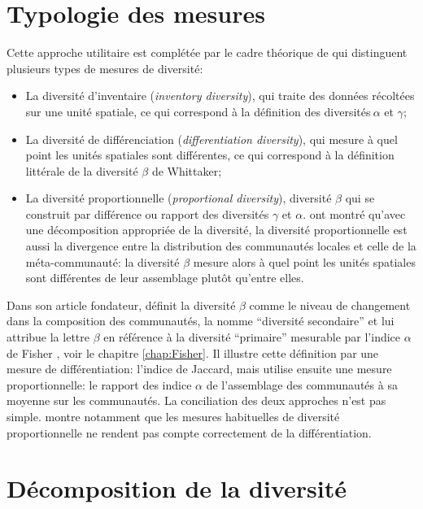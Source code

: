 \documentclass[
  11pt,
  french,
  a4paper,
  extrafontsizes,onecolumn,openright
  ]{memoir}
\providecommand{\tightlist}{%
  \setlength{\itemsep}{0pt}\setlength{\parskip}{0pt}}
\begin{document}
\hypertarget{sec:betaTypo}{%
\section{Typologie des mesures}\label{sec:betaTypo}}

Cette approche utilitaire est complétée par le cadre théorique de \textcite{Jurasinski2009} qui distinguent plusieurs types de mesures de diversité:

\begin{itemize}
\tightlist
\item
  La diversité d'inventaire (\emph{inventory diversity}), qui traite des données récoltées sur une unité spatiale, ce qui correspond à la définition des diversités\(\ \alpha\) et \(\gamma\);
\item
  La diversité de différenciation (\emph{differentiation diversity}), qui mesure à quel point les unités spatiales sont différentes, ce qui correspond à la définition littérale de la diversité \(\beta\) de Whittaker;
\item
  La diversité proportionnelle (\emph{proportional diversity}), diversité \(\beta\) qui se construit par différence ou rapport des diversités \(\gamma\) et \(\alpha\). \textcite{Marcon2014a} ont montré qu'avec une décomposition appropriée de la diversité, la diversité proportionnelle est aussi la divergence entre la distribution des communautés locales et celle de la méta-communauté: la diversité \(\beta\) mesure alors à quel point les unités spatiales sont différentes de leur assemblage plutôt qu'entre elles.
\end{itemize}

Dans son article fondateur, \textcite{Whittaker1960} définit la diversité \(\beta\) comme le niveau de changement dans la composition des communautés, la nomme \enquote{diversité secondaire} et lui attribue la lettre \(\beta\) en référence à la diversité \enquote{primaire} mesurable par l'indice \(\alpha\) de Fisher \autocite{Fisher1943}, voir le chapitre \ref{chap:Fisher}.
Il illustre cette définition par une mesure de différentiation: l'indice de Jaccard, mais utilise ensuite une mesure proportionnelle: le rapport des indice \(\alpha\) de l'assemblage des communautés à sa moyenne sur les communautés.
La conciliation des deux approches n'est pas simple.
\textcite{Gregorius2016} montre notamment que les mesures habituelles de diversité proportionnelle ne rendent pas compte correctement de la différentiation.

\hypertarget{sec:betaDecomposition}{%
\section{Décomposition de la diversité}\label{sec:betaDecomposition}}
\end{document}
